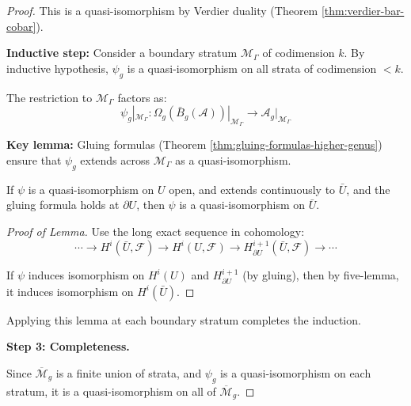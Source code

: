 \begin{proof}
This is a quasi-isomorphism by Verdier duality (Theorem \ref{thm:verdier-bar-cobar}).

\textbf{Inductive step:} Consider a boundary stratum $\mathcal{M}_\Gamma$ of 
codimension $k$. By inductive hypothesis, $\psi_g$ is a quasi-isomorphism on all 
strata of codimension $< k$.

The restriction to $\mathcal{M}_\Gamma$ factors as:
$$\psi_g|_{\mathcal{M}_\Gamma}: \Omega_g(\bar{B}_g(\mathcal{A}))|_{\mathcal{M}_\Gamma} 
\to \mathcal{A}_g|_{\mathcal{M}_\Gamma}$$

\textbf{Key lemma:} Gluing formulas (Theorem \ref{thm:gluing-formulas-higher-genus}) 
ensure that $\psi_g$ extends across $\mathcal{M}_\Gamma$ as a quasi-isomorphism.

\begin{lemma}\label{lem:extension-across-boundary-qi}
If $\psi$ is a quasi-isomorphism on $U$ open, and extends continuously to $\bar{U}$, 
and the gluing formula holds at $\partial U$, then $\psi$ is a quasi-isomorphism 
on $\bar{U}$.
\end{lemma}

\begin{proof}[Proof of Lemma]
Use the long exact sequence in cohomology:
$$\cdots \to H^i(\bar{U}, \mathcal{F}) \to H^i(U, \mathcal{F}) \to 
H^{i+1}_{\partial U}(\bar{U}, \mathcal{F}) \to \cdots$$

If $\psi$ induces isomorphism on $H^i(U)$ and $H^{i+1}_{\partial U}$ (by gluing), 
then by five-lemma, it induces isomorphism on $H^i(\bar{U})$.
\end{proof}

Applying this lemma at each boundary stratum completes the induction.

\textbf{Step 3: Completeness.}

Since $\overline{\mathcal{M}}_g$ is a finite union of strata, and $\psi_g$ is a 
quasi-isomorphism on each stratum, it is a quasi-isomorphism on all of $\overline{\mathcal{M}}_g$.
\end{proof}

